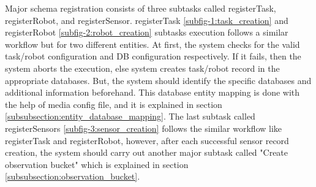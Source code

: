 	Major schema registration consists of three subtasks called registerTask, registerRobot, and registerSensor. registerTask \ref{subfig-1:task_creation} and registerRobot \ref{subfig-2:robot_creation} subtasks execution follows a similar workflow but for two different entities. At first, the system checks for the valid task/robot configuration and DB configuration respectively. If it fails, then the system aborts the execution, else system creates task/robot record in the appropriate databases. But, the system should identify the specific databases and additional information beforehand. This database entity mapping is done with the help of media config file, and it is explained in section \ref{subsubsection:entity_database_mapping}.
	The last subtask called registerSensors \ref{subfig-3:sensor_creation} follows the similar workflow like registerTask and registerRobot, however, after each successful sensor record creation, the system should carry out another major subtask called "Create observation bucket" which is explained in section \ref{subsubsection:observation_bucket}.
	
